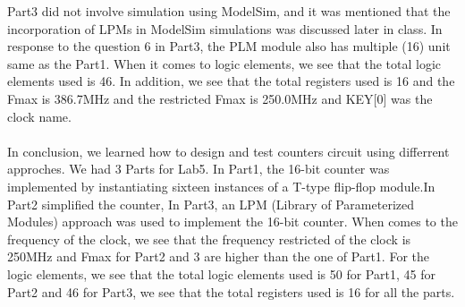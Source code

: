 \documentclass{article}
\begin{document}
Part3 did not involve simulation using ModelSim, and it was mentioned that the incorporation of LPMs in ModelSim simulations was discussed later in class.
In response to the question 6 in Part3, the PLM module also has multiple (16) unit same as the Part1.
When it comes to logic elements, we see that the total logic elements used is 46. In addition, we see that the total registers used is 16 and the Fmax is 386.7MHz and the restricted Fmax is 250.0MHz and KEY[0] was the clock name.
\\\\
In conclusion, we learned how to design and test counters circuit using differrent approches. We had 3 Parts for Lab5. 
In Part1, the 16-bit counter was implemented by instantiating sixteen instances of a T-type flip-flop module.In Part2 simplified the counter,
In Part3, an LPM (Library of Parameterized Modules) approach was used to implement the 16-bit counter. When comes to the frequency of the clock, we see that the frequency restricted of the clock is 250MHz and Fmax for Part2 and 3 are higher than the one of Part1.
For the logic elements, we see that the total logic elements used is 50 for Part1, 45 for Part2 and 46 for Part3, we see that the total registers used is 16 for all the parts.
\end{document}
